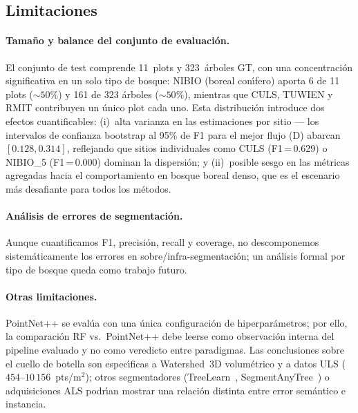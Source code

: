 \documentclass[runningheads]{llncs}
\begin{document}
\subsection{Limitaciones}

\paragraph{Tama\~no y balance del conjunto de evaluaci\'on.}
El conjunto de test comprende 11~plots y 323~\'arboles GT, con una concentraci\'on significativa en un solo tipo de bosque: NIBIO (boreal con\'\i{}fero) aporta 6 de 11 plots (${\sim}50\%$) y 161 de 323 \'arboles (${\sim}50\%$), mientras que CULS, TUWIEN y RMIT contribuyen un \'unico plot cada uno. Esta distribuci\'on introduce dos efectos cuantificables: (i)~alta varianza en las estimaciones por sitio --- los intervalos de confianza bootstrap al 95\% de F1 para el mejor flujo (D) abarcan $[0.128, 0.314]$, reflejando que sitios individuales como CULS (F1\,=\,0.629) o NIBIO\_5 (F1\,=\,0.000) dominan la dispersi\'on; y (ii)~posible sesgo en las m\'etricas agregadas hacia el comportamiento en bosque boreal denso, que es el escenario m\'as desafiante para todos los m\'etodos.

\paragraph{An\'alisis de errores de segmentaci\'on.}
Aunque cuantificamos F1, precisi\'on, recall y coverage, no descomponemos sistem\'aticamente los errores en sobre/infra-segmentaci\'on; un an\'alisis formal por tipo de bosque queda como trabajo futuro.

\paragraph{Otras limitaciones.}
PointNet++ se eval\'ua con una \'unica configuraci\'on de hiperpar\'ametros; por ello, la comparaci\'on RF vs.\ PointNet++ debe leerse como observaci\'on interna del pipeline evaluado y no como veredicto entre paradigmas. Las conclusiones sobre el cuello de botella son espec\'\i{}ficas a Watershed~3D volum\'etrico y a datos ULS ($454$--$10\,156$~pts/m$^2$); otros segmentadores (TreeLearn~\cite{henrich2024}, SegmentAnyTree~\cite{wielgosz2024}) o adquisiciones ALS podr\'\i{}an mostrar una relaci\'on distinta entre error sem\'antico e instancia.

\end{document}
